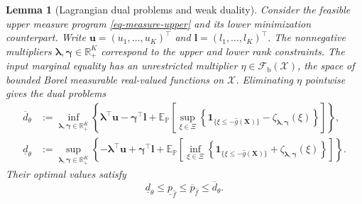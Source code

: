 \documentclass[review,11pt,3p,authoryear,nopreprintline]{elsarticle}
\newtheorem{lemma}{Lemma}
\begin{document}
\begin{lemma}[Lagrangian dual problems and weak duality]
  \label{lem-weak-duality}
  Consider the feasible upper measure program \eqref{eq-measure-upper} and its lower minimization counterpart. Write $\bm u=(u_1,\ldots,u_K)^\top$ and $\bm l=(l_1,\ldots,l_K)^\top$. The nonnegative multipliers $\bm\lambda,\bm\gamma\in\mathbb R_+^K$ correspond to the upper and lower rank constraints. The input marginal equality has an unrestricted multiplier $\eta\in\mathcal F_{\mathrm b}(\mathcal X)$, the space of bounded Borel measurable real-valued functions on $\mathcal X$. Eliminating $\eta$ pointwise gives the dual problems
  \begin{align}
    \overline d_\theta
    &:=\inf_{\bm\lambda,\bm\gamma\in\mathbb R_+^K}
    \left\{\bm\lambda^\top\bm u-\bm\gamma^\top\bm l
    +\mathbb E_{\mathbb P}\left[\sup_{\xi\in\Xi}\left\{
    \mathbf1_{\{\xi\le-\hat g(\bm X)\}}
    -\zeta_{\bm\lambda,\bm\gamma}(\xi)
    \right\}\right]\right\},
    \label{eq-upper-measure-dual}\\
    \underline d_\theta
    &:=\sup_{\bm\lambda,\bm\gamma\in\mathbb R_+^K}
    \left\{-\bm\lambda^\top\bm u+\bm\gamma^\top\bm l
    +\mathbb E_{\mathbb P}\left[\inf_{\xi\in\Xi}\left\{
    \mathbf1_{\{\xi\le-\hat g(\bm X)\}}
    +\zeta_{\bm\lambda,\bm\gamma}(\xi)
    \right\}\right]\right\}.
    \label{eq-lower-measure-dual}
  \end{align}
  Their optimal values satisfy
  \begin{equation}
    \underline d_\theta\le\underline p_{\hat f}
    \le\overline p_{\hat f}\le\overline d_\theta.
    \label{eq-weak-duality}
  \end{equation}
\end{lemma}
\end{document}
